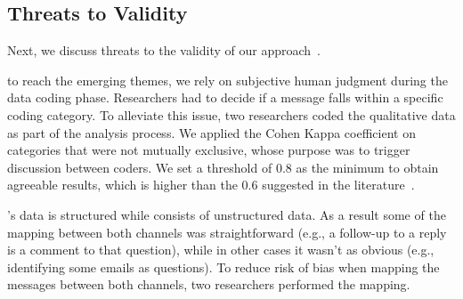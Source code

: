 

\subsection{Threats to Validity}
\label{cha:threats}
Next, we discuss threats to the validity of our approach~\cite{Runeson2012}.

\begin{description}[itemsep=3pt, topsep=2pt, leftmargin=1em, parsep=0pt]

\item[Construct validity:] to reach the emerging themes, we rely on subjective human judgment during the data coding phase. Researchers had to decide if a message falls within a specific coding category. To alleviate this issue, two researchers coded the qualitative data as part of the analysis process. We applied the Cohen Kappa coefficient on categories that were not mutually exclusive, whose purpose was to trigger discussion between coders. We set a threshold of 0.8 as the minimum to obtain agreeable results, which is higher than the 0.6 suggested in the literature~\cite{Landis1977}.

\item[Internal validity:] \SO's data is structured while \RH consists of unstructured data. As a result some of the mapping between both channels was straightforward (e.g., a follow-up to a reply is a comment to that question), while in other cases it wasn't as obvious (e.g., identifying some emails as questions). To reduce risk of bias when mapping the messages between both channels, two researchers performed the mapping.  




\end{description}
